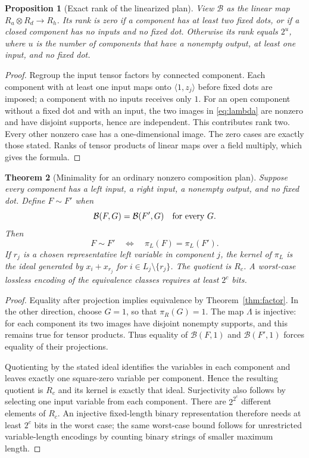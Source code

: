 \documentclass[11pt]{article}
\newtheorem{theorem}{Theorem}[section]
\newtheorem{proposition}[theorem]{Proposition}
\theoremstyle{definition}\newtheorem{definition}[theorem]{Definition}
\theoremstyle{remark}\newtheorem{remark}[theorem]{Remark}
\begin{document}
\begin{proposition}[Exact rank of the linearized plan]\label{prop:rank}
View $\mathcal B$ as the linear map $R_a\otimes R_d\to R_h$. Its rank is zero if a component has at least two fixed dots, or if a closed component has no inputs and no fixed dot. Otherwise its rank equals $2^u$, where $u$ is the number of components that have a nonempty output, at least one input, and no fixed dot.
\end{proposition}
\begin{proof}
Regroup the input tensor factors by connected component. Each component with at least one input maps onto $\langle1,z_j\rangle$ before fixed dots are imposed; a component with no inputs receives only $1$. For an open component without a fixed dot and with an input, the two images in \eqref{eq:lambda} are nonzero and have disjoint supports, hence are independent. This contributes rank two. Every other nonzero case has a one-dimensional image. The zero cases are exactly those stated. Ranks of tensor products of linear maps over a field multiply, which gives the formula.
\end{proof}

\begin{theorem}[Minimality for an ordinary nonzero composition plan]\label{thm:minimal}
Suppose every component has a left input, a right input, a nonempty output, and no fixed dot. Define $F\sim F'$ when
\[
 \mathcal B(F,G)=\mathcal B(F',G)\quad\hbox{for every }G.
\]
Then
\begin{equation}\label{eq:equivalence}
 F\sim F'\quad\Longleftrightarrow\quad \pi_L(F)=\pi_L(F').
\end{equation}
If $r_j$ is a chosen representative left variable in component $j$, the kernel of $\pi_L$ is the ideal generated by $x_i+x_{r_j}$ for $i\in L_j\setminus\{r_j\}$. The quotient is $R_c$. A worst-case lossless encoding of the equivalence classes requires at least $2^c$ bits.
\end{theorem}
\begin{proof}
Equality after projection implies equivalence by Theorem~\ref{thm:factor}. In the other direction, choose $G=1$, so that $\pi_R(G)=1$. The map $\Lambda$ is injective: for each component its two images have disjoint nonempty supports, and this remains true for tensor products. Thus equality of $\mathcal B(F,1)$ and $\mathcal B(F',1)$ forces equality of their projections.

Quotienting by the stated ideal identifies the variables in each component and leaves exactly one square-zero variable per component. Hence the resulting quotient is $R_c$ and its kernel is exactly that ideal. Surjectivity also follows by selecting one input variable from each component. There are $2^{2^c}$ different elements of $R_c$. An injective fixed-length binary representation therefore needs at least $2^c$ bits in the worst case; the same worst-case bound follows for unrestricted variable-length encodings by counting binary strings of smaller maximum length.
\end{proof}
\end{document}
